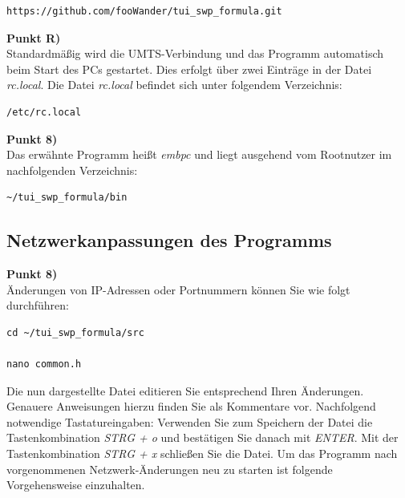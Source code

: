 \documentclass[fontsize = 12pt, paper = a4]{scrreprt}
\begin{document}
 \begin{lstlisting}[frame=single]
 https://github.com/fooWander/tui_swp_formula.git 
 \end{lstlisting}

\vspace*{-2mm} 

\textbf{Punkt R)} \\

Standardmäßig wird die UMTS-Verbindung und das Programm automatisch beim Start des PCs gestartet.
Dies erfolgt über zwei Einträge in der Datei \textit{rc.local}.
Die Datei \textit{rc.local} befindet sich unter folgendem Verzeichnis:

\vspace*{4mm}
\begin{lstlisting}[frame=single]
/etc/rc.local
\end{lstlisting} 
\vspace*{-2mm}

\textbf{Punkt 8)} \\

Das erwähnte Programm heißt \textit{embpc} und liegt ausgehend vom Rootnutzer im nachfolgenden Verzeichnis:

\vspace*{4mm}
\begin{lstlisting}[frame=single]
~/tui_swp_formula/bin
\end{lstlisting} 
\vspace*{-2mm}


\subsection{Netzwerkanpassungen des Programms}

\textbf{Punkt 8)} \\

Änderungen von IP-Adressen oder Portnummern können Sie wie folgt durchführen:

\vspace*{4mm}
\begin{lstlisting}[frame=single]
cd ~/tui_swp_formula/src

nano common.h
\end{lstlisting} 
\vspace*{-2mm}

Die nun dargestellte Datei editieren Sie entsprechend Ihren Änderungen. Genauere Anweisungen hierzu finden Sie als Kommentare vor.
Nachfolgend notwendige Tastatureingaben:
Verwenden Sie zum Speichern der Datei die Tastenkombination \textit{STRG + o} und bestätigen Sie danach mit \textit{ENTER}. Mit der Tastenkombination \textit{STRG + x} schließen Sie die Datei.
Um das Programm nach vorgenommenen Netzwerk-Änderungen neu zu starten ist folgende Vorgehensweise einzuhalten.
\end{document}
